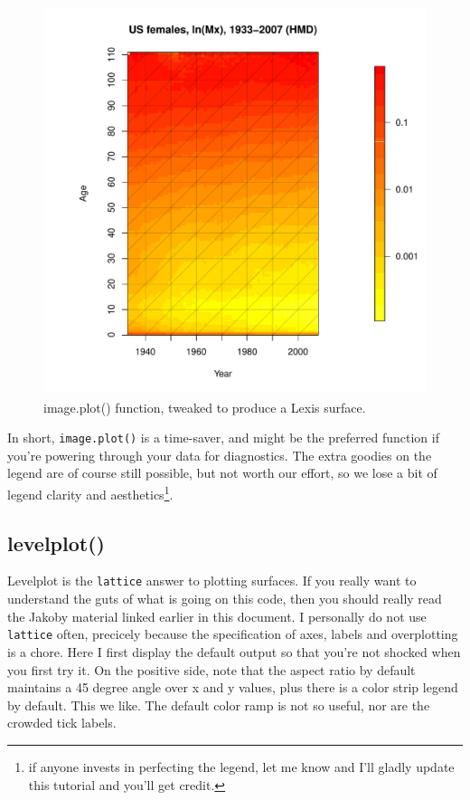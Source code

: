 \documentclass[a4paper]{article}
\begin{document}
\begin{figure}
\centering
\includegraphics[width=4.5in,height=4.5in]{figs/imageplotgood.pdf}
\caption{image.plot() function, tweaked to produce a Lexis surface.}
\end{figure}

In short, \texttt{image.plot()} is a time-saver, and might be the preferred function if you're powering through your data for diagnostics. The extra goodies on the legend are of course still possible, but not worth our effort, so we lose a bit of legend clarity and aesthetics\footnote{if anyone invests in perfecting the legend, let me know and I'll gladly update this tutorial and you'll get credit.}.

\subsection{levelplot()}
Levelplot is the \texttt{lattice} answer to plotting surfaces. If you really want to understand the guts of what is going on this code, then you should really read the Jakoby material linked earlier in this document. I personally do not use \texttt{lattice} often, precicely because the specification of axes, labels and overplotting is a chore. Here I first display the default output so that you're not shocked when you first try it. On the positive side, note that the aspect ratio by default maintains a 45 degree angle over x and y values, plus there is a color strip legend by default. This we like. The default color ramp is not so useful, nor are the crowded tick labels.
\end{document}
